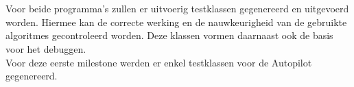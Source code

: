 
\\
\\
Voor beide programma's zullen er uitvoerig testklassen gegenereerd en uitgevoerd worden. Hiermee kan de correcte werking en de nauwkeurigheid van de gebruikte algoritmes gecontroleerd worden. Deze klassen vormen daarnaast ook de basis voor het debuggen.
\\
Voor deze eerste milestone werden er enkel testklassen voor de Autopilot gegenereerd.
